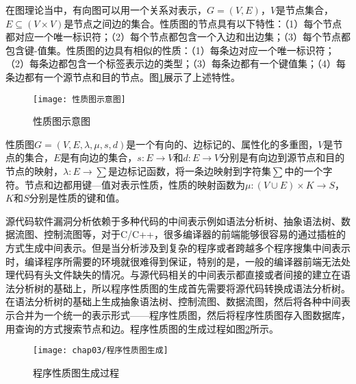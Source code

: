 在图理论当中，有向图可以用一个关系对表示，$G=(V,E)$，$V$是节点集合，$E\subseteq(V \times V)$是节点之间边的集合。性质图的节点具有以下特性：{（1）}每个节点都对应一个唯一标识符；{（2）}每个节点都包含一个入边和出边集；{（3）}每个节点都包含键-值集。性质图的边具有相似的性质：{（1）}每条边对应一个唯一标识符；{（2）}每条边都包含一个标签表示边的类型；{（3）}每条边都有一个键值集；{（4）}每条边都有一个源节点和目的节点。图\ref{性质图示意图}展示了上述特性。


\begin{figure}[htp]
\centering
\texttt{[image: 性质图示意图]}
\caption{性质图示意图}
\label{性质图示意图}
\end{figure}


\begin{definition}
 \label{性质图定义}
 性质图$G=(V,E,\lambda ,\mu, s,d)$是一个有向的、边标记的、属性化的多重图，$V$是节点的集合，$E$是有向边的集合，$s: E \rightarrow V$和$d:E \rightarrow V$分别是有向边到源节点和目的节点的映射，$\lambda : E \rightarrow \sum $是边标记函数，将一条边映射到字符集$\sum$中的一个字符。节点和边都用键—值对表示性质，性质的映射函数为$\mu:(V \cup E) \times K \rightarrow S$，$K$和$S$分别是性质的键和值。
\end{definition}

源代码软件漏洞分析依赖于多种代码的中间表示例如语法分析树、抽象语法树、数据流图、控制流图等，对于C/C++，很多编译器的前端能够很容易的通过插桩的方式生成中间表示。但是当分析涉及到复杂的程序或者跨越多个程序搜集中间表示时，编译程序所需要的环境就很难得到保证，特别的是，一般的编译器前端无法处理代码有头文件缺失的情况。与源代码相关的中间表示都直接或者间接的建立在语法分析树的基础上，所以程序性质图的生成首先需要将源代码转换成语法分析树。在语法分析树的基础上生成抽象语法树、控制流图、数据流图，然后将各种中间表示合并为一个统一的表示形式——程序性质图，然后将程序性质图存入图数据库，用查询的方式搜索节点和边。程序性质图的生成过程如图\ref{程序性质图生成过程}所示。

\begin{figure}[htp]
\centering
\texttt{[image: chap03/程序性质图生成]}
\caption{程序性质图生成过程}
\label{程序性质图生成过程}
\end{figure}

